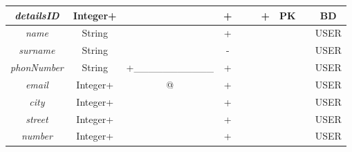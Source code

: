 \documentclass[12pt,twoside]{report}
\begin{document}
\begin{enumerate}[start=10,label={\bfseries REL\textbackslash\arabic*}]
\begin{table}[H]
\begin{tabular}{|c|c|c|c|c|c|c|c|c|c|}
			\hline			
			\textit{detailsID}&Integer+&&+&&&+&PK&&BD\\	
			\hline			
			\textit{name}&String&&+&&&&&&USER\\	
			\hline			
			\textit{surname}&String&&-&&&&&&USER\\	
			\hline			
			\textit{phonNumber}&String&+\_\_\_\_\_\_\_\_\_\_\_&+&&&&&&USER\\	
			\hline			
			\textit{email}&Integer+&\underline{\qquad\qquad}@\underline{\qquad}&+&&&&&&USER\\	
			\hline			
			\textit{city}&Integer+&&+&&&&&&USER\\	
			\hline			
			\textit{street}&Integer+&&+&&&&&&USER\\	
			\hline			
			\textit{number}&Integer+&&+&&&&&&USER\\	
			\hline
		\end{tabular}
	\end{table}
	

\end{enumerate}
\end{document}
